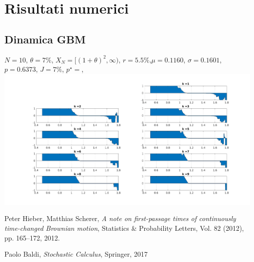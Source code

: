 \documentclass[12pt,a4paper]{article}
\theoremstyle{break}
\begin{document}
\section{Risultati numerici}
\subsection{Dinamica GBM}
$N=10$, $\theta=7\%$, $X_N= [(1+\theta)^2,\infty)$, $r= 5.5\%$,$\mu= 0.1160$, $\sigma = 0.1601$, $p = 0.6373$, $J=7\%$, $p^{\star}=$, 
\centering
\includegraphics[scale = 0.5]{maps.png}

\begin{thebibliography}{9}
	
	Peter Hieber, Matthias Scherer,
	\textit{A note on first-passage times of continuously time-changed Brownian motion},
	Statistics \& Probability Letters, Vol. 82 (2012), pp. 165–172,
	2012.
	
	Paolo Baldi,
	\textit{Stochastic Calculus},
	Springer, 2017

\end{thebibliography}
\end{document}
